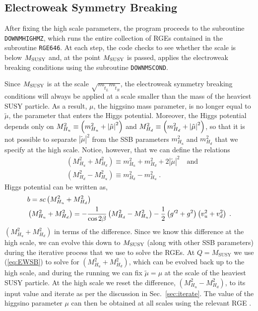 \subsection{Electroweak Symmetry Breaking}

After fixing the high scale parameters, the program proceeds to the
subroutine \texttt{DOWNMHIGHMZ}, which runs the entire collection of
RGEs contained in the subroutine \texttt{RGE646}. At each step, the code
checks to see whether the scale is below $M_{\mathrm{SUSY}}$ and, at the point
$M_{\mathrm{SUSY}}$ is passed, applies the electroweak breaking conditions using
the subroutine \texttt{DOWNMSCOND}.

Since $M_{\mathrm{SUSY}}$ is at the scale
$\sqrt{m_{\tilde{t}_{L}}m_{\tilde{t}_{R}}}$, the electroweak symmetry
breaking conditions will always be applied at a scale smaller than the
mass of the heaviest SUSY particle. As a result, $\mu$, the higgsino
mass parameter, is no longer equal to $\tilde{\mu}$, the parameter that
enters the Higgs potential. Moreover, the Higgs potential depends only
on $M^{2}_{H_{u}}\equiv\left(m^{2}_{H_{u}}+\left|\tilde{\mu}\right|^{2}\right)$ and
$M^{2}_{H_{d}}\equiv\left(m^{2}_{H_{d}}+\left|\tilde{\mu}\right|^{2}\right)$, so that it is not
possible to separate $\left|\tilde{\mu}\right|^2$ from the SSB
parameters $m_{H_u}^2$ and $m_{H_d}^2$ that we specify at the high
scale. Notice, however, that we can define the relations %
\begin{eqnarray*} &\left(M^{2}_{H_{u}}+M^{2}_{H_{d}}\right)\equiv
m^{2}_{H_{u}}+m^{2}_{H_{d}}+2\left|\tilde{\mu}\right|^{2}\quad\mathrm{and}\\
&\left(M^{2}_{H_{d}}-M^{2}_{H_{u}}\right)\equiv
m^{2}_{H_{d}}-m^{2}_{H_{u}}\;.
\end{eqnarray*} %
Higgs potential can be written as, %
\begin{eqnarray}
&b=sc\left(M^{2}_{H_{u}}+M^{2}_{H_{d}}\right)\label{eq:EWSB2}\\
&\left(M^{2}_{H_{u}}+M^{2}_{H_{d}}\right)=-\frac{1}{\cos{2\beta}}\left(M^{2}_{H_{d}}-M^{2}_{H_{u}}\right)-\frac{1}{2}\left(g'^{2}+g^{2}\right)\left(v^{2}_{u}+v^{2}_{d}\right)\label{eq:EWSB}\;.
\end{eqnarray} %
$(M^{2}_{H_{u}}+M^{2}_{H_{d}})$ in terms of the difference.  Since we
know this difference at the high scale, we can evolve this down to
$M_{\rm SUSY}$ (along with other SSB parameters) during the iterative
process that we use to solve the RGEs. At $Q=M_{\mathrm{SUSY}}$ we use
(\ref{eq:EWSB}) to solve for $(M^{2}_{H_{u}}+M^{2}_{H_{d}})$, which can
be evolved back up to the high scale, and during the running we can fix
$\tilde{\mu}=\mu$ at the scale of the heaviest SUSY particle. At the
high scale we reset the difference, $(M^{2}_{H_{u}}-M^{2}_{H_{d}})$, to
its input value and iterate as per the discussion in
Sec.~\ref{sec:iterate}. The value of the higgsino parameter $\mu$ can
then be obtained at all scales using the relevant RGE \cite{RGE2}.

